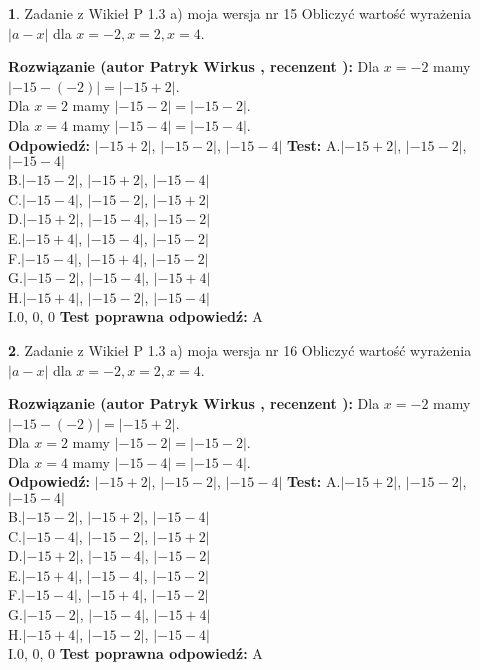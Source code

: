 \documentclass[12pt, a4paper]{article}
\theoremstyle{definition} %
\newtheorem{zad}{}
\newcommand{\zadStart}[1]{\begin{zad}#1\newline}
\newcommand{\zadStop}{\end{zad}}
\newcommand{\rozwStart}[2]{\noindent \textbf{Rozwiązanie (autor #1 , recenzent #2): }\newline}
\newcommand{\rozwStop}{\newline}
\newcommand{\odpStart}{\noindent \textbf{Odpowiedź:}\newline}
\newcommand{\odpStop}{\newline}
\newcommand{\testStart}{\noindent \textbf{Test:}\newline}
\newcommand{\testStop}{\newline}
\newcommand{\kluczStart}{\noindent \textbf{Test poprawna odpowiedź:}\newline}
\newcommand{\kluczStop}{\newline}
\begin{document}
\zadStart{Zadanie z Wikieł P 1.3 a) moja wersja nr 15}
Obliczyć wartość wyrażenia $|a - x|$ dla $x=-2,x=2,x=4$.
\zadStop
\rozwStart{Patryk Wirkus}{}
Dla $x = -2$ mamy $|-15 - (-2)| = |-15 + 2|$.\\
Dla $x = 2$ mamy $|-15 - 2| = |-15 - 2|$.\\
Dla $x = 4$ mamy $|-15 - 4| = |-15 - 4|$.\\
\rozwStop
\odpStart
$|-15 + 2|$, $|-15 - 2|$, $|-15 - 4|$
\odpStop
\testStart
A.$|-15 + 2|$, $|-15 - 2|$, $|-15 - 4|$\\
B.$|-15 - 2|$, $|-15 + 2|$, $|-15 - 4|$\\
C.$|-15 - 4|$, $|-15 - 2|$, $|-15 + 2|$\\
D.$|-15 + 2|$, $|-15 - 4|$, $|-15 - 2|$\\
E.$|-15 + 4|$, $|-15 - 4|$, $|-15 - 2|$\\
F.$|-15 - 4|$, $|-15 + 4|$, $|-15 - 2|$\\
G.$|-15 - 2|$, $|-15 - 4|$, $|-15 + 4|$\\
H.$|-15 + 4|$, $|-15 - 2|$, $|-15 - 4|$\\
I.$0$, $0$, $0$
\testStop
\kluczStart
A
\kluczStop



\zadStart{Zadanie z Wikieł P 1.3 a) moja wersja nr 16}
Obliczyć wartość wyrażenia $|a - x|$ dla $x=-2,x=2,x=4$.
\zadStop
\rozwStart{Patryk Wirkus}{}
Dla $x = -2$ mamy $|-15 - (-2)| = |-15 + 2|$.\\
Dla $x = 2$ mamy $|-15 - 2| = |-15 - 2|$.\\
Dla $x = 4$ mamy $|-15 - 4| = |-15 - 4|$.\\
\rozwStop
\odpStart
$|-15 + 2|$, $|-15 - 2|$, $|-15 - 4|$
\odpStop
\testStart
A.$|-15 + 2|$, $|-15 - 2|$, $|-15 - 4|$\\
B.$|-15 - 2|$, $|-15 + 2|$, $|-15 - 4|$\\
C.$|-15 - 4|$, $|-15 - 2|$, $|-15 + 2|$\\
D.$|-15 + 2|$, $|-15 - 4|$, $|-15 - 2|$\\
E.$|-15 + 4|$, $|-15 - 4|$, $|-15 - 2|$\\
F.$|-15 - 4|$, $|-15 + 4|$, $|-15 - 2|$\\
G.$|-15 - 2|$, $|-15 - 4|$, $|-15 + 4|$\\
H.$|-15 + 4|$, $|-15 - 2|$, $|-15 - 4|$\\
I.$0$, $0$, $0$
\testStop
\kluczStart
A
\kluczStop
\end{document}
